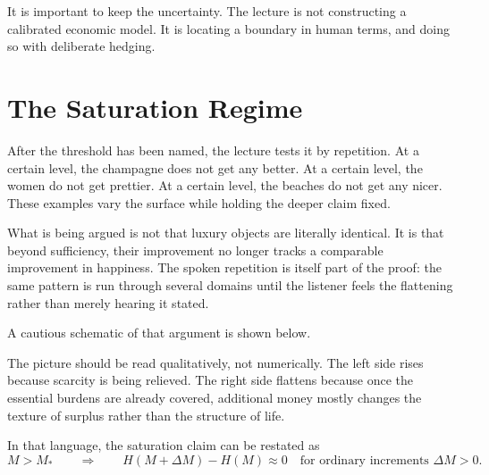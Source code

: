 It is important to keep the uncertainty. The lecture is not constructing a calibrated economic model. It is locating a boundary in human terms, and doing so with deliberate hedging.

\section{The Saturation Regime}

After the threshold has been named, the lecture tests it by repetition. At a certain level, the champagne does not get any better. At a certain level, the women do not get prettier. At a certain level, the beaches do not get any nicer. These examples vary the surface while holding the deeper claim fixed.

What is being argued is not that luxury objects are literally identical. It is that beyond sufficiency, their improvement no longer tracks a comparable improvement in happiness. The spoken repetition is itself part of the proof: the same pattern is run through several domains until the listener feels the flattening rather than merely hearing it stated.

A cautious schematic of that argument is shown below.

\begin{figure}
\centering
{}
\end{figure}

The picture should be read qualitatively, not numerically. The left side rises because scarcity is being relieved. The right side flattens because once the essential burdens are already covered, additional money mostly changes the texture of surplus rather than the structure of life.

In that language, the saturation claim can be restated as
\begin{equation}
M>M_*
\qquad \Longrightarrow \qquad
H(M+\Delta M)-H(M)\approx 0
\quad
\text{for ordinary increments } \Delta M>0.
\end{equation}

